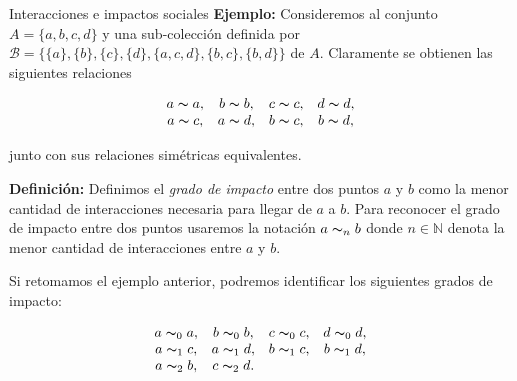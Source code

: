 \documentclass[9pt]{beamer}
\begin{document}
\begin{frame}{Interacciones e impactos sociales}
\textbf{Ejemplo:} Consideremos al conjunto $A=\{a,b,c,d\}$ y una sub-colección definida por $\mathcal{B} = \{\{a\},\{b\},\{c\},\{d\},\{a,c,d\}, \{b,c\}, \{b,d\}\}$ de $A$. Claramente se obtienen las siguientes relaciones

$$\begin{array}{cccc}
    a\thicksim a, & b\thicksim b, & c\thicksim c, & d\thicksim d, \\ 
    a\thicksim c, & a\thicksim d, & b\thicksim c, & b\thicksim d,
\end{array}$$

junto con sus relaciones simétricas equivalentes. 

\textbf{Definición:} Definimos el \textit{grado de impacto} entre dos puntos $a$ y $b$ como la menor cantidad de interacciones necesaria para llegar de $a$ a $b$. Para reconocer el grado de impacto entre dos puntos usaremos la notación $a\thicksim_n b$ donde $n\in\mathbb{N}$ denota la menor cantidad de interacciones entre $a$ y $b$.

Si retomamos el ejemplo anterior, podremos identificar los siguientes grados de impacto:

$$\begin{array}{cccc}
    a\thicksim_0 a, & b\thicksim_0 b, & c\thicksim_0 c, & d\thicksim_0 d, \\ 
    a\thicksim_1 c, & a\thicksim_1 d, & b\thicksim_1 c, & b\thicksim_1 d, \\
    a\thicksim_2 b, & c\thicksim_2 d.
\end{array}$$
\end{frame}
\end{document}
